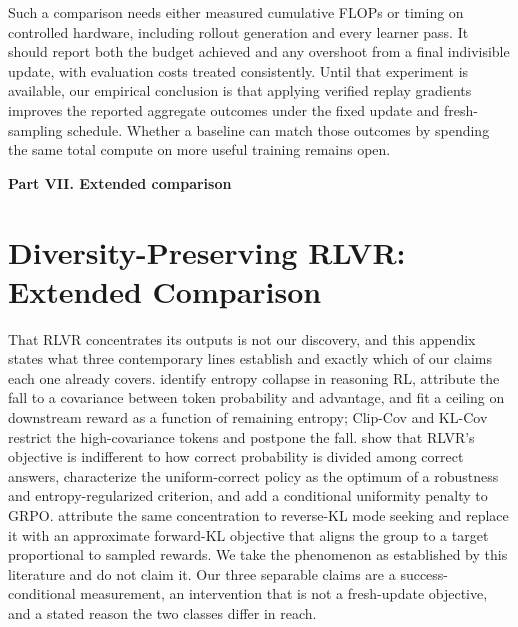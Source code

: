 \documentclass{article}
\newcommand{\1}{\mathbf 1}
\theoremstyle{remark}
\theoremstyle{definition}
\theoremstyle{plain}
\begin{document}
Such a comparison needs either measured cumulative FLOPs or timing on
controlled hardware, including rollout generation and every learner pass.
It should report both the budget achieved and any overshoot from a final
indivisible update, with evaluation costs treated consistently. Until that
experiment is available, our empirical conclusion is that applying verified
replay gradients improves the reported aggregate outcomes under the fixed update and
fresh-sampling schedule. Whether a baseline can match those outcomes by
spending the same total compute on more useful training remains open.

\clearpage
{}
\begin{center}\large\textbf{Part VII. Extended comparison}\end{center}

\section{Diversity-Preserving RLVR: Extended Comparison}
\label{app:related-extended}

That RLVR concentrates its outputs is not our discovery, and this appendix
states what three contemporary lines establish and exactly which of our claims
each one already covers.
\citet{cui2025entropy} identify entropy collapse in reasoning RL, attribute the
fall to a covariance between token probability and advantage, and fit a ceiling
on downstream reward as a function of remaining entropy; Clip-Cov and KL-Cov
restrict the high-covariance tokens and postpone the fall.
\citet{lochab2026ucpo} show that RLVR's objective is indifferent to how correct
probability is divided among correct answers, characterize the uniform-correct
policy as the optimum of a robustness and entropy-regularized criterion, and
add a conditional uniformity penalty to GRPO.
\citet{li2026distribution} attribute the same concentration to reverse-KL
mode seeking and replace it with an approximate forward-KL objective that
aligns the group to a target proportional to sampled rewards.
We take the phenomenon as established by this literature and do not claim it.
Our three separable claims are a success-conditional measurement, an
intervention that is not a fresh-update objective, and a stated reason the two
classes differ in reach.
\end{document}
